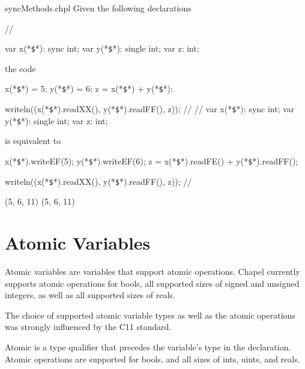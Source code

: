 \begin{chapelexample}{syncMethods.chpl}
Given the following declarations
\begin{chapelpre}
{ // }
\end{chapelpre}
\begin{chapel}
var x(*\texttt{\$}*): sync int;
var y(*\texttt{\$}*): single int;
var z: int;
\end{chapel}
the code
\begin{chapel}
x(*\texttt{\$}*) = 5;
y(*\texttt{\$}*) = 6;
z = x(*\texttt{\$}*) + y(*\texttt{\$}*);
\end{chapel}
\begin{chapelnoprint}
writeln((x(*\texttt{\$}*).readXX(), y(*\texttt{\$}*).readFF(), z));
// {
}
{ // }
var x(*\texttt{\$}*): sync int;
var y(*\texttt{\$}*): single int;
var z: int;
\end{chapelnoprint}
is equivalent to
\begin{chapel}
x(*\texttt{\$}*).writeEF(5);
y(*\texttt{\$}*).writeEF(6);
z = x(*\texttt{\$}*).readFE() + y(*\texttt{\$}*).readFF();
\end{chapel}
\begin{chapelpost}
writeln((x(*\texttt{\$}*).readXX(), y(*\texttt{\$}*).readFF(), z));
// {
}
\end{chapelpost}
\begin{chapeloutput}
(5, 6, 11)
(5, 6, 11)
\end{chapeloutput}
\end{chapelexample}



\section{Atomic Variables}
\label{Atomic_Variables}

Atomic variables are variables that support atomic operations. Chapel
currently supports atomic operations for bools, all supported sizes of
signed and unsigned integers, as well as all supported sizes of reals.

\begin{rationale}
The choice of supported atomic variable types as well as the atomic
operations was strongly influenced by the C11 standard.
\end{rationale}

Atomic is a type qualifier that precedes the variable's type in
the declaration. Atomic operations are supported for bools, and all
sizes of ints, uints, and reals.

